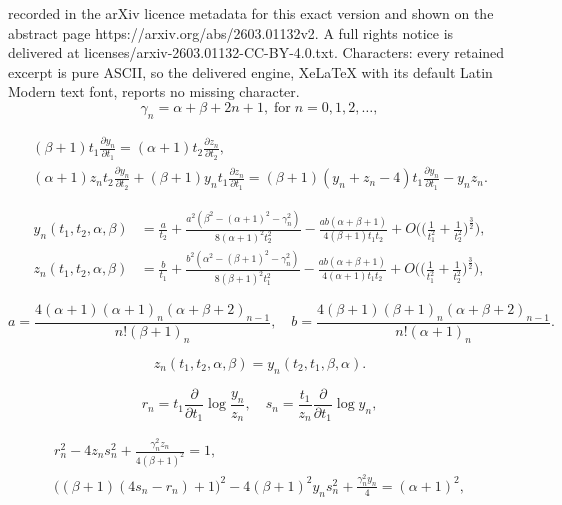 \documentclass[10pt,a4paper]{amsart}
\begin{document}
recorded in the arXiv licence metadata for this exact version and shown on the abstract page https://arxiv.org/abs/2603.01132v2. A full rights notice is delivered at licenses/arxiv-2603.01132-CC-BY-4.0.txt. Characters: every retained excerpt is pure ASCII, so the delivered engine, XeLaTeX with its default Latin Modern text font, reports no missing character.
\begin{equation}
\gamma_n=\alpha+\beta+2n+1,\;\mbox{for}\; n=0,1,2,\ldots, \label{Kga}
\end{equation}

\begin{gather}
(\beta+1)t_1\frac{\partial y_n}{\partial t_1}=(\alpha+1)t_2\frac{\partial z_n}{\partial t_2},\label{PK1}\\
(\alpha+1)z_nt_2\frac{\partial y_n}{\partial t_2}+(\beta+1)y_nt_1\frac{\partial z_n}{\partial t_1}=(\beta+1)(y_n+z_n-4)t_1\frac{\partial y_n}{\partial t_1}-y_nz_n.\label{PK2}
\end{gather}

\begin{align}
y_n(t_1,t_2,\alpha,\beta)&=\frac{a}{t_2}+\frac{a^2(\beta^2-(\alpha+1)^2-\gamma_n^2)}{8(\alpha+1)^2t_2^2}-\frac{ab(\alpha+\beta+1)}{4 (\beta+1)t_1t_2}+O\Big(\Big(\frac{1}{t_1^2} +\frac{1}{t_2^2}\Big)^\frac{3}{2}\Big),\label{aKy2}\\
z_n(t_1,t_2,\alpha,\beta)&=\frac{b}{t_1}+\frac{b^2(\alpha^2-(\beta+1)^2-\gamma_n^2)}{8(\beta+1)^2t_1^2}-\frac{ab(\alpha+\beta+1)}{4(\alpha+1)t_1t_2}+O\Big(\Big(\frac{1}{t_1^2} +\frac{1}{t_2^2}\Big)^\frac{3}{2}\Big),\label{aKz2}
\end{align}

\begin{equation}
a=\frac{4(\alpha+1)(\alpha+1)_n(\alpha+\beta+2)_{n-1}}{n!(\beta+1)_n}, \quad b=\frac{4(\beta+1)(\beta+1)_n(\alpha+\beta+2)_{n-1}}{n!(\alpha+1)_n}.\label{ab}
\end{equation}

\begin{equation}
z_n(t_1,t_2,\alpha,\beta)=y_n(t_2,t_1,\beta,\alpha).\label{zy}
\end{equation}

\begin{equation} 
r_n=t_1\frac{\partial}{\partial t_1} \log\frac{y_n}{z_n},\quad s_n=\frac{t_1}{z_n}\frac{\partial}{\partial t_1}\log y_n,\label{rs}
\end{equation}

\begin{gather}
r_n^2-4z_ns_n^2+\frac{\gamma_n^2z_n}{4(\beta+1)^2}=1,\label{SKFI1}\\
\big((\beta+1)(4s_n-r_n)+1\big)^2-4(\beta+1)^2y_ns_n^2+\frac{\gamma_n^2 y_n}{4}=(\alpha+1)^2,\label{SKFI2}
\end{gather} 
\end{document}
